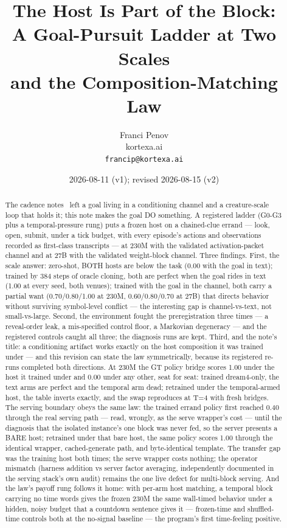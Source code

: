 \documentclass[11pt]{article}
\title{The Host Is Part of the Block:\\A Goal-Pursuit Ladder at Two Scales\\and the Composition-Matching Law}
\author{Franci Penov \\ kortexa.ai \\ \texttt{francip@kortexa.ai}}
\date{2026-08-11 (v1); revised 2026-08-15 (v2)}
\begin{document}
\maketitle

\begin{abstract}
The cadence notes~\cite{penov2026carrier,penov2026writer} left a goal
living in a conditioning channel and a creature-scale loop that holds
it; this note makes the goal DO something. A registered ladder (G0-G3
plus a temporal-pressure rung) puts a frozen host on a chained-clue
errand --- look, open, submit, under a tick budget, with every
episode's actions and observations recorded as first-class transcripts
--- at 230M with the validated activation-packet channel and at 27B
with the validated weight-block channel. Three findings. First, the
scale answer: zero-shot, BOTH hosts are below the task (0.00 with the
goal in text); trained by 384 steps of oracle cloning, both are perfect
when the goal rides in text (1.00 at every seed, both venues); trained
with the goal in the channel, both carry a partial want
(0.70/0.80/1.00 at 230M, 0.60/0.80/0.70 at 27B) that
directs behavior without surviving symbol-level conflict --- the
interesting gap is channel-vs-text, not small-vs-large. Second, the
environment fought the preregistration three times --- a reveal-order
leak, a mis-specified control floor, a Markovian degeneracy --- and the
registered controls caught all three; the diagnosis runs are kept.
Third, and the note's title: a conditioning artifact works exactly on
the host composition it was trained under --- and this revision can
state the law symmetrically, because its registered re-runs completed
both directions. At 230M the GT policy bridge scores 1.00 under the
host it trained under and 0.00 under any other, seat for seat: trained
dream4-only, the text arms are perfect and the temporal arm dead;
retrained under the temporal-armed host, the table inverts exactly,
and the swap reproduces at T=4 with fresh bridges. The serving
boundary obeys the same law: the trained errand policy first reached
0.40 through the real serving path --- read, wrongly, as the serve
wrapper's cost --- until the diagnosis that the isolated instance's
one block was never fed, so the server presents a BARE host; retrained
under that bare host, the same policy scores 1.00 through the
identical wrapper, cached-generate path, and byte-identical template.
The transfer gap was the training host both times; the serve wrapper
costs nothing; the operator mismatch (harness addition vs server
factor averaging, independently documented in the serving stack's own
audit) remains the one live defect for multi-block serving. And the
law's payoff rung follows it home: with per-arm host matching, a
temporal block carrying no time words gives the frozen 230M the same
wall-timed behavior under a hidden, noisy budget that a countdown
sentence gives it --- frozen-time and shuffled-time controls both at
the no-signal baseline --- the program's first time-feeling positive.
\end{abstract}
\end{document}
